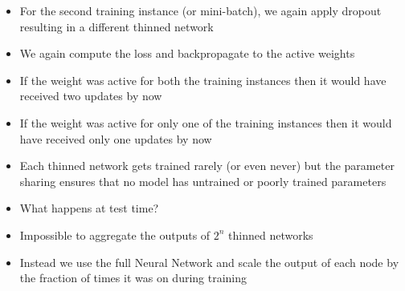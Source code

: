 \begin{frame}			
	
	
	
	
\begin{itemize}
		\justifying
		\item<1-> For the second training instance (or mini-batch), we again apply dropout resulting in a different thinned network
		\item<2-> We again compute the loss and backpropagate to the active weights
		\item<4-> If the weight was active for both the training instances then it would have received two updates by now
		\item<5-> If the weight was active for only one of the training instances then it would have received only one updates by now
		\item<6-> Each thinned network gets trained rarely (or even never) but the parameter sharing ensures that no model has untrained or poorly trained parameters
	\end{itemize}
							
\end{frame}


\begin{frame}
	
	
	\begin{itemize}
		\item<2-> What happens at test time?
		\item<3-> Impossible to aggregate the outputs of $2^n$ thinned networks
		\item<4-> Instead we use the full Neural Network and scale the output of each node by the fraction of times it was on during training
	\end{itemize}
						
\end{frame}
				
% 	
% 					
					
